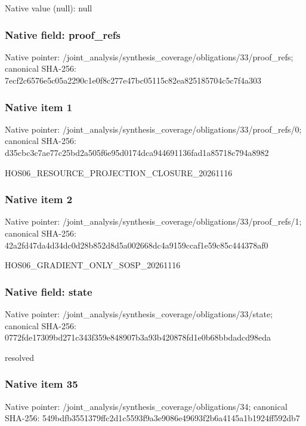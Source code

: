 \documentclass[10pt,a4paper]{article}
\begin{document}
Native value (null): null

\subsubsection{Native field: proof\_\allowbreak{}refs}
Native pointer: /joint\_\allowbreak{}analysis/synthesis\_\allowbreak{}coverage/obligations/33/proof\_\allowbreak{}refs; canonical SHA-256: 7ecf2c6576e5c05a2290c1e0f8c277e47bc05115c82ea825185704c5c7f4a303

\subsubsection{Native item 1}
Native pointer: /joint\_\allowbreak{}analysis/synthesis\_\allowbreak{}coverage/obligations/33/proof\_\allowbreak{}refs/0; canonical SHA-256: d35cbc3c7ae77c25bd2a505f6e95d0174dca944691136fad1a85718c794a8982

\begingroup\raggedright\sloppy HOS06\_\allowbreak{}RESOURCE\_\allowbreak{}PROJECTION\_\allowbreak{}CLOSURE\_\allowbreak{}20261116\par\endgroup

\subsubsection{Native item 2}
Native pointer: /joint\_\allowbreak{}analysis/synthesis\_\allowbreak{}coverage/obligations/33/proof\_\allowbreak{}refs/1; canonical SHA-256: 42a2fd47da4d34dc0d28b852d8d5a002668dc4a9159ccaf1e59c85c444378af0

\begingroup\raggedright\sloppy HOS06\_\allowbreak{}GRADIENT\_\allowbreak{}ONLY\_\allowbreak{}SOSP\_\allowbreak{}20261116\par\endgroup

\subsubsection{Native field: state}
Native pointer: /joint\_\allowbreak{}analysis/synthesis\_\allowbreak{}coverage/obligations/33/state; canonical SHA-256: 0772fde17309bd271c343f359e848907b3a93b420878fd1e0b68bbdadcd98eda

\begingroup\raggedright\sloppy resolved\par\endgroup

\subsubsection{Native item 35}
Native pointer: /joint\_\allowbreak{}analysis/synthesis\_\allowbreak{}coverage/obligations/34; canonical SHA-256: 549bdfb3551379ffc2d1c5593f9a3e9086e49693f2b6a4145a1b1924ff592db7
\end{document}

